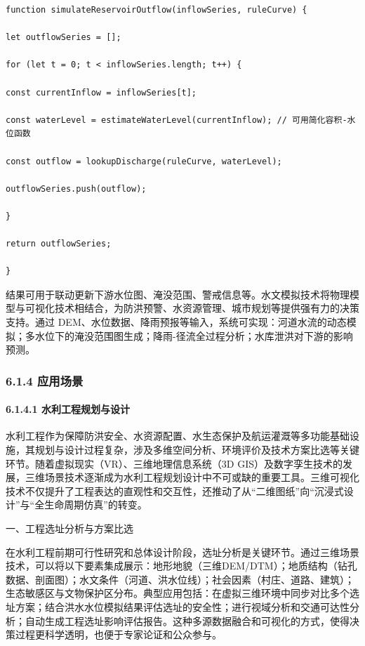 \begin{lstlisting}
function simulateReservoirOutflow(inflowSeries, ruleCurve) {

let outflowSeries = [];

for (let t = 0; t < inflowSeries.length; t++) {

const currentInflow = inflowSeries[t];

const waterLevel = estimateWaterLevel(currentInflow); // 可用简化容积-水位函数

const outflow = lookupDischarge(ruleCurve, waterLevel);

outflowSeries.push(outflow);

}

return outflowSeries;

}
\end{lstlisting}

结果可用于联动更新下游水位图、淹没范围、警戒信息等。水文模拟技术将物理模型与可视化技术相结合，为防洪预警、水资源管理、城市规划等提供强有力的决策支持。通过 DEM、水位数据、降雨预报等输入，系统可实现：河道水流的动态模拟；多水位下的淹没范围图生成；降雨-径流全过程分析；水库泄洪对下游的影响预测。

\hypertarget{ux5e94ux7528ux573aux666f}{%
\subsubsection{6.1.4 应用场景}\label{ux5e94ux7528ux573aux666f}}

\hypertarget{ux6c34ux5229ux5de5ux7a0bux89c4ux5212ux4e0eux8bbeux8ba1}{%
\paragraph{6.1.4.1 水利工程规划与设计}\label{ux6c34ux5229ux5de5ux7a0bux89c4ux5212ux4e0eux8bbeux8ba1}}

水利工程作为保障防洪安全、水资源配置、水生态保护及航运灌溉等多功能基础设施，其规划与设计过程复杂，涉及多维空间分析、环境评价及技术方案比选等关键环节。随着虚拟现实（VR）、三维地理信息系统（3D GIS）及数字孪生技术的发展，三维场景技术逐渐成为水利工程规划设计中不可或缺的重要工具。三维可视化技术不仅提升了工程表达的直观性和交互性，还推动了从``二维图纸''向``沉浸式设计''与``全生命周期仿真''的转变。

一、工程选址分析与方案比选

在水利工程前期可行性研究和总体设计阶段，选址分析是关键环节。通过三维场景技术，可以将以下要素集成展示：地形地貌（三维DEM/DTM）；地质结构（钻孔数据、剖面图）；水文条件（河道、洪水位线）；社会因素（村庄、道路、建筑）；生态敏感区与文物保护区分布。典型应用包括：在虚拟三维环境中同步对比多个选址方案；结合洪水水位模拟结果评估选址的安全性；进行视域分析和交通可达性分析；自动生成工程选址影响评估报告。这种多源数据融合和可视化的方式，使得决策过程更科学透明，也便于专家论证和公众参与。

